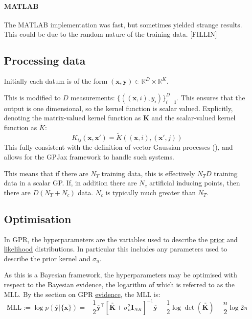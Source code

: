 \documentclass[12pt,a4paper,twoside]{report}
\theoremstyle{definition}
\begin{document}
\paragraph{MATLAB}
The MATLAB implementation was fast, but sometimes yielded strange results. This could be due to the random nature of the training data. [FILLIN]

\subsection{Processing data}
Initially each datum is of the form $(\mathbf x,\mathbf y)\in\mathbb{R}^D\times \mathbb{R}^K$.

This is modified to $D$ measurements: $\{((\mathbf x, i), y_i)\}_{i=1}^D$. This ensures that the output is one dimensional, so the kernel function is scalar valued. Explicitly, denoting the matrix-valued kernel function as $\mathbf K$ and the scalar-valued kernel function as $\tilde K$:
$$K_{ij}(\mathbf x,\mathbf x') = \tilde K((\mathbf x,i),(\mathbf x',j))$$
This fully consistent with the definition of vector Gaussian processes (), and allows for the GPJax framework to handle such systems.

This means that if there are $N_T$ training data, this is effectively $N_TD$ training data in a scalar GP. If, in addition there are $N_c$ artificial inducing points, then there are $D(N_T+N_c)$ data. $N_c$ is typically much greater than $N_T$.

\subsection{Optimisation}\label{sub:Optimisation}
In GPR, the hyperparameters are the variables used to describe the \hyperref[prior]{prior} and \hyperref[likelihood]{likelihood} distributions. In particular this includes any parameters used to describe the prior kernel and $\sigma_n$.

As this is a Bayesian framework, the hyperparameters may be optimised with respect to the Bayesian evidence, the logarithm of which is referred to as the MLL. By the section on GPR \hyperref[evidence]{evidence}, the MLL is:
\begin{equation*}
	\text{MLL} := \log p(\mathbf{\overline y}|\{\mathbf x\}) = -\frac{1}{2}\mathbf{\overline y}^\top \left[\mathbf{\overline{\overline K}} + \sigma_n^2 \mathbf I_{NK}\right]^{-1}\mathbf{\overline y} - \frac{1}{2}\log \det\left(\mathbf{\overline{\overline K}}\right) - \frac{n}{2}\log 2\pi
\end{equation*}
\end{document}
